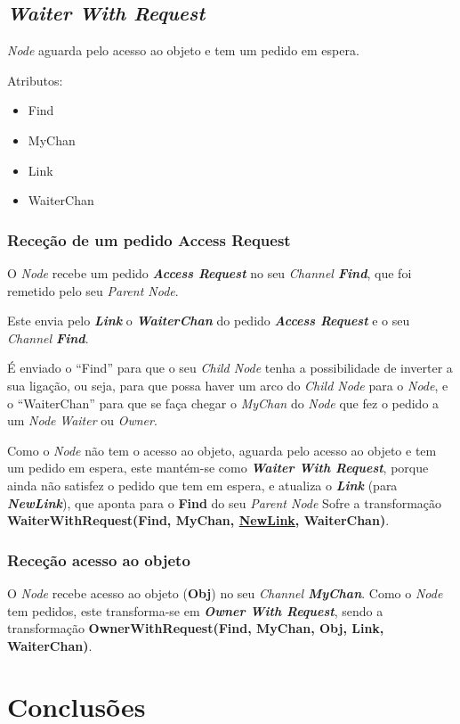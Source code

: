 \subsection*{\emph{Waiter With Request}}
\label{especificacao:nodes:waiter_with_request}

\emph{Node} aguarda pelo acesso ao objeto e tem um pedido em espera.


Atributos:
\begin{itemize}
    \item Find 
    \item MyChan 
    \item Link 
    \item WaiterChan 
\end{itemize}



\subsubsection*{Receção de um pedido Access Request}
O \emph{Node} recebe um pedido \emph{\textbf{Access Request}} no seu \emph{Channel \textbf{Find}}, que foi remetido pelo seu \emph{Parent Node}.

Este envia pelo \textbf{\emph{Link}} o \textbf{\emph{WaiterChan}} do pedido \emph{\textbf{Access Request}} e o seu \emph{Channel \textbf{Find}}.

É enviado o ``Find'' para que o seu \emph{Child Node} tenha a possibilidade de inverter a sua ligação, ou seja, para que possa haver um arco do \emph{Child Node} para o \emph{Node}, 
e o ``WaiterChan'' para que se faça chegar o \emph{MyChan} do \emph{Node} que fez o pedido a um \emph{Node} \emph{Waiter} ou \emph{Owner}.

Como o \emph{Node} não tem o acesso ao objeto, aguarda pelo acesso ao objeto e tem um pedido em espera, este mantém-se como \emph{\textbf{Waiter With Request}},
porque ainda não satisfez o pedido que tem em espera, 
e atualiza o \textbf{\emph{Link}} (para \textbf{\emph{NewLink}}), que aponta para o \textbf{Find} do seu \emph{Parent Node}
Sofre a transformação \textbf{WaiterWithRequest(Find, MyChan, \underline{NewLink}, WaiterChan)}.


\subsubsection*{Receção acesso ao objeto}
O \emph{Node} recebe acesso ao objeto (\textbf{Obj}) no seu \emph{Channel \textbf{MyChan}}.
Como o \emph{Node} tem pedidos, este transforma-se em \textbf{\emph{Owner With Request}}, sendo a transformação \textbf{OwnerWithRequest(Find, MyChan, Obj, Link, WaiterChan)}.


\section{Conclusões}
